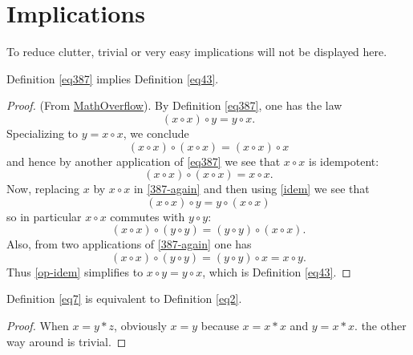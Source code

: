 \chapter{Implications}

To reduce clutter, trivial or very easy implications will not be displayed here.

\begin{theorem}[387 implies 43]\label{387_implies_43}\leanok  Definition \ref{eq387} implies Definition \ref{eq43}.
\end{theorem}

\begin{proof}\leanok (From \href{https://mathoverflow.net/a/450905/766}{MathOverflow}).
  By Definition \ref{eq387}, one has the law
\begin{equation}\label{387-again}
  (x \circ x) \circ y = y \circ x.
\end{equation}
Specializing to $y=x \circ x$, we conclude
$$(x \circ x) \circ (x \circ x) = (x \circ x) \circ x$$
and hence by another application of \eqref{eq387} we see that $x \circ x$ is idempotent:
\begin{equation}\label{idem}
  (x \circ x) \circ (x \circ x) = x \circ x.
\end{equation}
Now, replacing $x$ by $x \circ x$ in \eqref{387-again} and then using \eqref{idem} we see that
$$ (x \circ x) \circ y = y \circ (x \circ x)$$
so in particular $x \circ x$ commutes with $y \circ y$:
\begin{equation}\label{op-idem} (x \circ x) \circ (y \circ y) = (y \circ y) \circ (x \circ x).
\end{equation}
Also, from two applications of \eqref{387-again} one has
$$(x \circ x) \circ (y \circ y) = (y \circ y) \circ x = x \circ y.$$
Thus \eqref{op-idem} simplifies to $x \circ y = y \circ x$, which is Definition \ref{eq43}.
\end{proof}

\begin{theorem}[7 equivalent to 2]\label{7_equiv_2}\leanok  Definition \ref{eq7} is equivalent to Definition \ref{eq2}.
\end{theorem}

\begin{proof}\leanok
  When $x = y * z$, obviously $x = y$ because $x = x * x$ and $y = x * x$. the other way around is trivial.
\end{proof}


